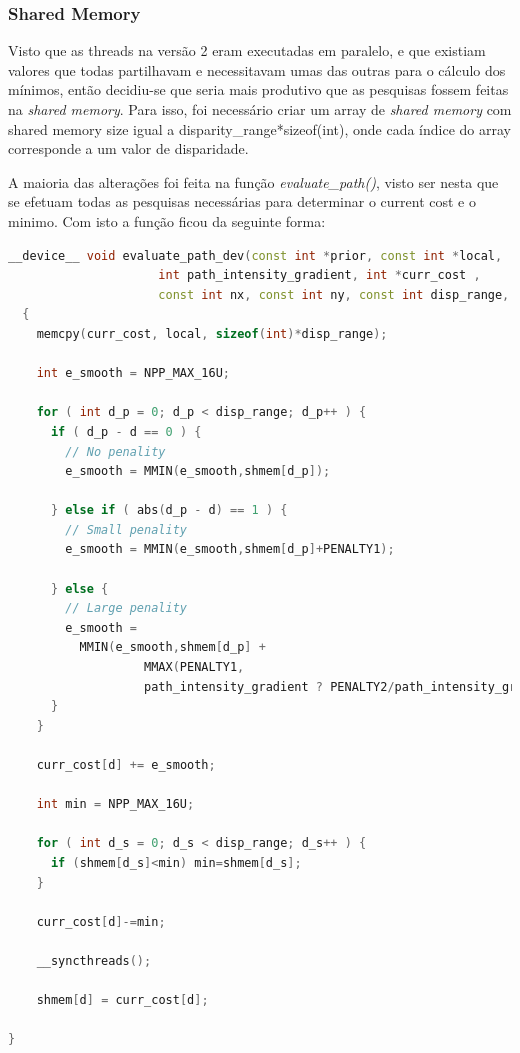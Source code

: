 \documentclass[pdftex,12pt,a4paper]{report}
\begin{document}
\newpage
\subsubsection{Shared Memory}

Visto que as threads na versão 2 eram executadas em paralelo, e que existiam valores que todas partilhavam e necessitavam umas das outras para o cálculo dos mínimos, então decidiu-se que seria mais produtivo que as pesquisas fossem feitas na \textit{shared memory}. Para isso, foi necessário criar um array de \textit{shared memory} com shared memory size igual a disparity\_range*sizeof(int), onde cada índice do array corresponde a um valor de disparidade.

A maioria das alterações foi feita na função \textit{evaluate\_path()}, visto ser nesta que se efetuam todas as pesquisas necessárias para determinar o current cost e o minimo. Com isto a função ficou da seguinte forma:

  \begin{lstlisting}[language=c++, basicstyle=\scriptsize]
__device__ void evaluate_path_dev(const int *prior, const int *local,
                     int path_intensity_gradient, int *curr_cost ,
                     const int nx, const int ny, const int disp_range, const int d, int shmem[])
  {
    memcpy(curr_cost, local, sizeof(int)*disp_range);
    
    int e_smooth = NPP_MAX_16U;

    for ( int d_p = 0; d_p < disp_range; d_p++ ) {
      if ( d_p - d == 0 ) {
        // No penality
        e_smooth = MMIN(e_smooth,shmem[d_p]);
        
      } else if ( abs(d_p - d) == 1 ) {
        // Small penality
        e_smooth = MMIN(e_smooth,shmem[d_p]+PENALTY1);
        
      } else {
        // Large penality
        e_smooth =
          MMIN(e_smooth,shmem[d_p] +
                   MMAX(PENALTY1,
                   path_intensity_gradient ? PENALTY2/path_intensity_gradient : PENALTY2));
      }
    }

    curr_cost[d] += e_smooth;

    int min = NPP_MAX_16U;
    
    for ( int d_s = 0; d_s < disp_range; d_s++ ) {
      if (shmem[d_s]<min) min=shmem[d_s];
    }
    
    curr_cost[d]-=min;
    
    __syncthreads();
    
    shmem[d] = curr_cost[d];

}

\end{lstlisting} 
\end{document}
